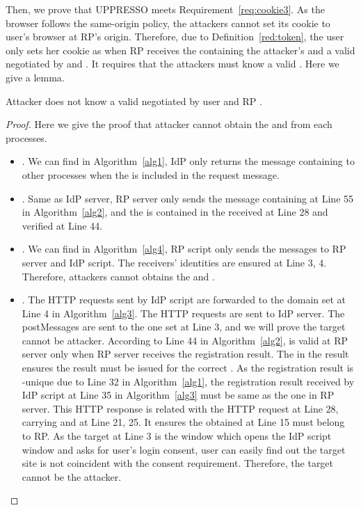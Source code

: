 Then, we prove that UPPRESSO meets Requirement~\ref{req:cookie3}. As the browser follows the same-origin policy,  the attackers cannot set its cookie to user's browser at RP's origin. Therefore, due to Definition~\ref{red:token}, the user only  sets her cookie as  when RP receives the  containing the attacker's  and a  valid  negotiated by  and . It requires that the attackers must know a valid . Here we give a lemma.
\begin{relemma}
Attacker does not know a valid  negotiated by user  and RP .
\end{relemma}
\begin{proof}
Here we give the proof that attacker cannot obtain the  and  from each processes.
\begin{itemize}
\setlength\itemsep{-2pt}
\item {}. We can find in Algorithm~\ref{alg1}, IdP only returns the message containing  to other processes when the  is included in the request message.
\item {}. Same as IdP server, RP server only sends the message containing   at Line 55 in Algorithm~\ref{alg2}, and the  is contained in the  received at Line 28 and verified at Line 44.
\item {}. We can find in  Algorithm~\ref{alg4}, RP script  only sends the messages to RP server and IdP script. The receivers' identities are ensured at Line 3, 4. Therefore, attackers cannot obtains the   and .
\item {}. The HTTP requests sent by IdP script are forwarded to the domain set at Line 4 in Algorithm~\ref{alg3}. The HTTP requests are sent to IdP server. The postMessages are sent to the one set at Line 3, and we will prove the target cannot be attacker.
According to Line 44 in Algorithm~\ref{alg2},   is valid at RP server only when RP server receives the registration result. The  in the result ensures the result must be issued for the correct . As the registration result is -unique due to Line 32 in Algorithm~\ref{alg1}, the registration result received by IdP script at Line 35 in Algorithm~\ref{alg3} must be same as the one in RP server.
This HTTP response is related with the HTTP request at Line 28, carrying  and  at Line 21, 25. It ensures the  obtained at Line 15 must belong to RP. As the target at Line 3 is the window which opens the IdP script window and asks for user's login consent, user can easily find out the target site is not coincident with the consent requirement. Therefore, the target cannot be the attacker.
\end{itemize}
\end{proof}

